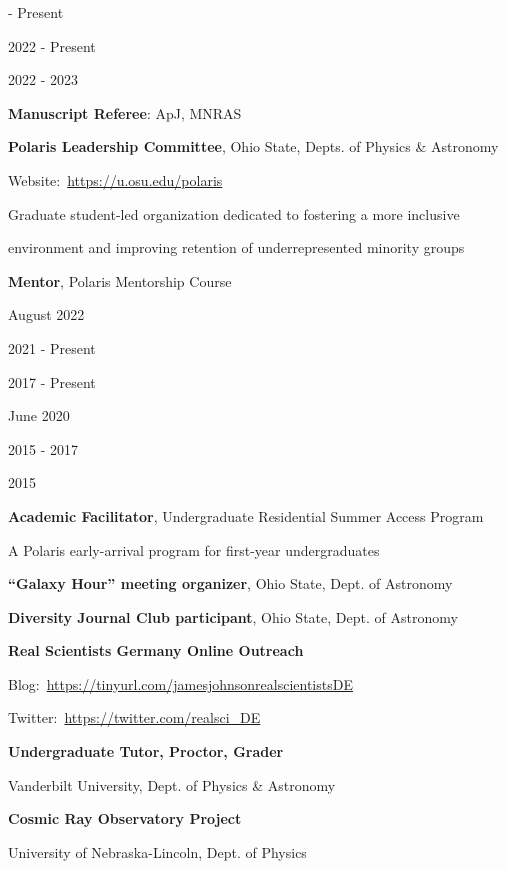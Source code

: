 \documentclass[cv.tex]{subfiles}
\begin{document}
\parbox{0.18\textwidth}{%
	 - Present \par
	2022 - Present \par
	\null \par
	\null \par
	\null \par
	2022 - 2023 \par
}
\hspace{1mm}
\parbox{0.8\textwidth}{%
	\vspace{1mm}
	\textbf{Manuscript Referee}: ApJ, MNRAS \par
	\textbf{Polaris Leadership Committee}, Ohio State, Depts. of Physics \&
	Astronomy \par
	Website:~\url{https://u.osu.edu/polaris} \par
	Graduate student-led organization dedicated to fostering a more inclusive
	\par
	environment and improving retention of underrepresented minority groups \par
	\textbf{Mentor}, Polaris Mentorship Course \par
}

\noindent
\parbox{0.18\textwidth}{%
	\raggedleft
	August 2022 \par
	\null \par
	2021 - Present \par
	2017 - Present \par
	June 2020 \par
	\null \par
	\null \par
	2015 - 2017 \par
	\null \par
	2015 \par
	\null \par
}
\hspace{1mm}
\parbox{0.8\textwidth}{%
	\vspace{1mm}
	\textbf{Academic Facilitator}, Undergraduate Residential Summer Access
	Program \par
	A Polaris early-arrival program for first-year undergraduates \par
	\textbf{``Galaxy Hour'' meeting organizer}, Ohio State, Dept. of Astronomy
	\par
	\textbf{Diversity Journal Club participant}, Ohio State,
	Dept. of Astronomy \par
	\textbf{Real Scientists Germany Online Outreach} \par
	Blog:~\url{https://tinyurl.com/jamesjohnsonrealscientistsDE} \par
	Twitter:~\url{https://twitter.com/realsci_DE} \par
	\textbf{Undergraduate Tutor, Proctor, Grader} \par
	Vanderbilt University, Dept. of Physics \& Astronomy \par
	\textbf{Cosmic Ray Observatory Project} \par
	University of Nebraska-Lincoln, Dept. of Physics \par
}
\end{document}
